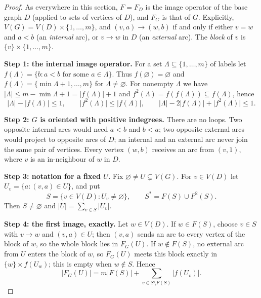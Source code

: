 \documentclass[11pt]{article}
\theoremstyle{remark}
\newcommand{\abs}[1]{\lvert #1\rvert}
\newcommand{\Step}[1]{\par\medskip\noindent\textbf{#1}\enspace}
\begin{document}
\begin{proof}
As everywhere in this section, $F=F_D$ is the image operator of the base
graph $D$ (applied to sets of vertices of $D$), and $F_G$ is that of $G$.
Explicitly, $V(G)=V(D)\times\{1,\dots,m\}$, and $(v,a)\to(w,b)$ if and only
if either $v=w$ and $a<b$ (an \emph{internal} arc), or $v\to w$ in $D$ (an
\emph{external} arc). The \emph{block} of $v$ is $\{v\}\times\{1,\dots,m\}$.

\Step{Step 1: the internal image operator.}
For a set $\Lambda\subseteq\{1,\dots,m\}$ of labels let
$f(\Lambda)=\{b:a<b\text{ for some }a\in\Lambda\}$. Thus
$f(\varnothing)=\varnothing$ and
$f(\Lambda)=\{\min\Lambda+1,\dots,m\}$ for $\Lambda\ne\varnothing$. For
nonempty $\Lambda$ we have $\abs\Lambda\le m-\min\Lambda+1=\abs{f(\Lambda)}+1$
and $f^2(\Lambda)=f(f(\Lambda))\subseteq f(\Lambda)$, hence
\begin{equation}
\label{eq:internal-block-bound}
  \abs{\Lambda}-\abs{f(\Lambda)}\le1,\qquad
  \abs{f^2(\Lambda)}\le\abs{f(\Lambda)},\qquad
  \abs{\Lambda}-2\abs{f(\Lambda)}+\abs{f^2(\Lambda)}\le1 .
\end{equation}

\Step{Step 2: $G$ is oriented with positive indegrees.}
There are no loops. Two opposite internal arcs would need $a<b$ and $b<a$;
two opposite external arcs would project to opposite arcs of $D$; an
internal and an external arc never join the same pair of vertices. Every
vertex $(w,b)$ receives an arc from $(v,1)$, where $v$ is an in-neighbour
of $w$ in $D$.

\Step{Step 3: notation for a fixed $U$.}
Fix $\varnothing\ne U\subsetneq V(G)$. For $v\in V(D)$ let
$U_v=\{a:(v,a)\in U\}$, and put
\[
  S=\{v\in V(D):U_v\ne\varnothing\},\qquad
  S^{*}=F(S)\cup F^2(S).
\]
Then $S\ne\varnothing$ and $\abs U=\sum_{v\in S}\abs{U_v}$.

\Step{Step 4: the first image, exactly.}
Let $w\in V(D)$. If $w\in F(S)$, choose $v\in S$ with $v\to w$ and
$(v,a)\in U$; then $(v,a)$ sends an arc to every vertex of the block of
$w$, so the whole block lies in $F_G(U)$. If $w\notin F(S)$, no external
arc from $U$ enters the block of $w$, so $F_G(U)$ meets this block exactly
in $\{w\}\times f(U_w)$; this is empty when $w\notin S$. Hence
\begin{equation}\label{eq:first-image}
  \abs{F_G(U)}=m\abs{F(S)}
     +\sum_{v\in S\setminus F(S)}\abs{f(U_v)}.
\end{equation}


\end{proof}
\end{document}
